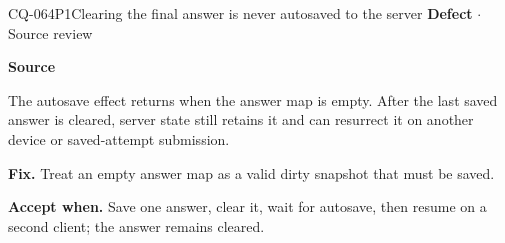 \begin{finding}{CQ-064}{P1}{Clearing the final answer is never autosaved to the server}
\textbf{Defect} $\cdot$ Source review\par
\textbf{Source}\quad{}\par
The autosave effect returns when the answer map is empty. After the last saved answer is cleared, server state still retains it and can resurrect it on another device or saved-attempt submission.\par
\textbf{Fix.} Treat an empty answer map as a valid dirty snapshot that must be saved.\par
\textbf{Accept when.} Save one answer, clear it, wait for autosave, then resume on a second client; the answer remains cleared.
\end{finding}
\clearpage
